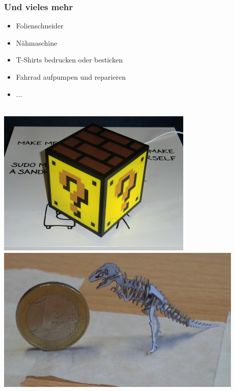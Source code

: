 \documentclass[t]{beamer}
\begin{document}
\begin{frame}
    \frametitle{Und vieles mehr}
    \begin{itemize}
        \item Folienschneider
        \item Nähmaschine
        \item T-Shirts bedrucken oder besticken
        \item Fahrrad aufpumpen und reparieren
        \item ...
    \end{itemize}
    \begin{center}
        ~\\

        \includegraphics[height=7cm]{../img/mariolampe.jpg}
        \hspace{1em}
        \includegraphics[height=7cm]{../img/tinysaur.jpg}
    \end{center}
\end{frame}
\end{document}
